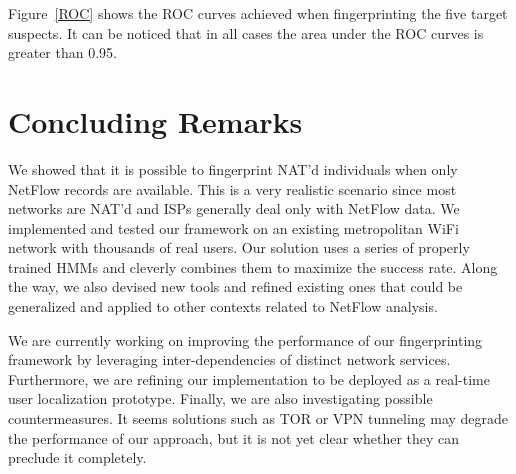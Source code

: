 \documentclass[10pt,conference,compsocconf,letterpaper]{IEEEtran}
\begin{document}
\begin{figure*}[ht]
  \centering 
      \caption{ROC curves for each suspected user.\label{ROC}}
\end{figure*}

Figure~\ref{ROC} shows the ROC curves achieved when fingerprinting the
five target suspects. It can be noticed that in all cases the area
under the ROC curves is greater than 0.95. 


\section{Concluding Remarks}
\label{sec:conclusion}
We showed that it is possible to fingerprint NAT'd individuals when only NetFlow records are available. This is 
a very realistic scenario since most networks are NAT'd and ISPs generally deal only with NetFlow data.
We implemented and tested our framework on an existing metropolitan WiFi network with thousands of real users. 
Our solution uses a series of properly trained HMMs and cleverly combines them to maximize the success rate. 
Along the way, we also devised new tools and refined existing ones that could be generalized and applied to other contexts related to NetFlow analysis.

We are currently working on improving the performance of our fingerprinting framework by leveraging inter-dependencies of distinct network services. Furthermore, we are refining our implementation to be deployed as a 
real-time user localization prototype. Finally, we are also investigating possible countermeasures. It seems solutions such as TOR or VPN tunneling may degrade the performance of our approach, but it is not yet clear whether they can preclude it completely.  








\balance

\end{document}

